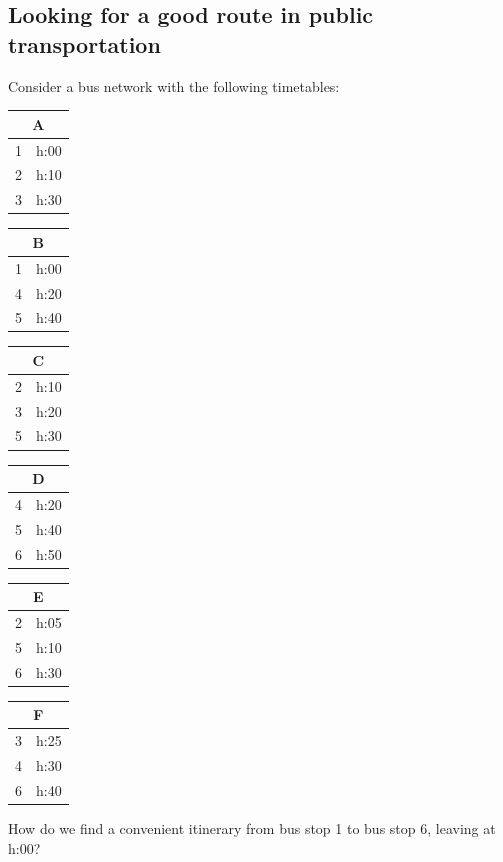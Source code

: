 \documentclass[a4paper]{book}
\theoremstyle{changebreak}                %
\begin{document}
\subsection{Looking for a good route in public transportation}
Consider a bus network with the following timetables:
\begin{center}
\begin{minipage}{2.5cm}
\begin{tabular}{c|c}
\multicolumn{2}{c}{A} \\ \hline
1 & h:00 \\
2 & h:10 \\
3 & h:30
\end{tabular}
\end{minipage}
\begin{minipage}{2.5cm}
\begin{tabular}{c|c}
\multicolumn{2}{c}{B} \\ \hline
1 & h:00 \\
4 & h:20 \\
5 & h:40  
\end{tabular}
\end{minipage}
\begin{minipage}{2.5cm}
\begin{tabular}{c|c}
\multicolumn{2}{c}{C} \\ \hline
2 & h:10 \\
3 & h:20\\
5 & h:30 
\end{tabular}
\end{minipage}  
\begin{minipage}{2.5cm}
\begin{tabular}{c|c}
\multicolumn{2}{c}{D} \\ \hline
4 & h:20 \\
5 & h:40 \\
6 & h:50 
\end{tabular}
\end{minipage}
\begin{minipage}{2.5cm}
\begin{tabular}{c|c}
\multicolumn{2}{c}{E} \\ \hline
2 & h:05 \\
5 & h:10 \\
6 & h:30
\end{tabular}
\end{minipage}
\begin{minipage}{2.5cm}
\begin{tabular}{c|c}
\multicolumn{2}{c}{F} \\ \hline
3 & h:25 \\
4 & h:30 \\
6 & h:40 
\end{tabular}
\end{minipage}
\end{center}
How do we find a convenient itinerary from bus stop 1
to bus stop 6, leaving at h:00? 
\end{document}

